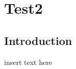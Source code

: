 
\graphicspath{{chapt_dutch/}{intro/}{chapt2/}{chapt3/}{chapt4/}{chapt5/}{chapt6/}{chapt7/}}

\renewcommand\evenpagerightmark{{\scshape\small Appendix B}}
\renewcommand\oddpageleftmark{{\scshape\small Test2}}

\renewcommand{\bibname}{References}

\hyphenation{}

\chapter[Test2]%
{Test2}\label{app2}


\section{Introduction}
insert text here

\clearpage{\pagestyle{empty}\cleardoublepage}